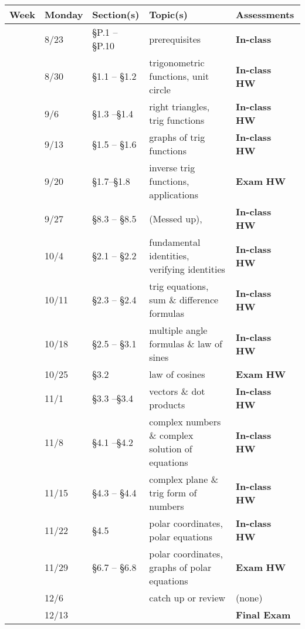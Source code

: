 \documentclass[12pt]{article}
\newcounter{qz}\setcounter{qz}{0}
\newcommand{\qz}{%
\setcounter{qz}{\value{qz}+1}
\textbf{In-class  \theqz} \,}
\newcounter{hw}\setcounter{hw}{0}
\newcommand{\hw}{%
\setcounter{hw}{\value{hw}+1}
\textbf{HW \thehw} \,\,}
\newcounter{ex}\setcounter{ex}{0}
\newcommand{\ex}{%
\setcounter{ex}{\value{ex}+1}
Exam \theex}
\newcounter{wk}\setcounter{wk}{0}
\newcommand{\wk}{%
\setcounter{wk}{\value{wk}+1}
\thewk \,\,}
\begin{document}
\begin{center}
    \small
\begin{tabular}  {|l|l|l|l|l|}
\hline
{\bf Week}  & \textbf{Monday} &  {\bf Section(s)} & {\bf Topic(s)} & \textbf{Assessments} \\
\hline \hline 
\wk    & 8/23 &    \S P.1 -- \S P.10   & prerequisites & \qz  \\
\wk    & 8/30  &  \S1.1 -- \S1.2  &  trigonometric functions, unit circle  & \qz \hw  \\
\wk    & 9/6 &     \S1.3 --\S1.4  &   right triangles, trig functions  & \qz \hw \\
\wk    & 9/13  &     \S1.5 -- \S1.6  & graphs of trig functions  & \qz \hw            \\
\wk    & 9/20 &  \S1.7--\S1.8    &  inverse trig functions, applications    & \textbf{\ex} \hw \\ \hline
\wk    & 9/27   & \S8.3 -- \S8.5   & (Messed up), &  \qz \hw  \\
\wk    & 10/4     & \S2.1 -- \S2.2  & fundamental identities, verifying identities  & \qz \hw  \\
\wk   & 10/11   & \S2.3 -- \S2.4  &  trig equations, sum \& difference formulas   & \qz \hw  \\
\wk  &  10/18   & \S2.5 -- \S3.1 &  multiple angle formulas \& law of sines   & \qz  \hw \\ 
\wk &  10/25     &   \S3.2&  law of cosines   &  \textbf{ \ex}  \hw \\ \hline
\wk  & 11/1  &   \S3.3 --\S3.4  &  vectors \& dot products  & \qz  \hw  \\
\wk   & 11/8  & \S4.1 --\S4.2  &   complex numbers  \& complex solution of equations  & \qz \hw \\
\wk   & 11/15& \S4.3 -- \S4.4   & complex plane \&  trig form of numbers  & \qz \hw  \\
\wk   & 11/22   &  \S4.5     & polar coordinates, polar equations    & \qz  \hw   \\
\wk   & 11/29    &  \S6.7 -- \S6.8      &  polar coordinates, graphs of polar equations  & \textbf{ \ex} \hw   \\ \hline
\wk   & 12/6      &         &  catch up or review  & (none) \\  \hline
\wk   & 12/13      &  &     \hfill  & \textbf{ Final Exam}  \\  \hline
   
\end{tabular}
\end{center}
\end{document}
